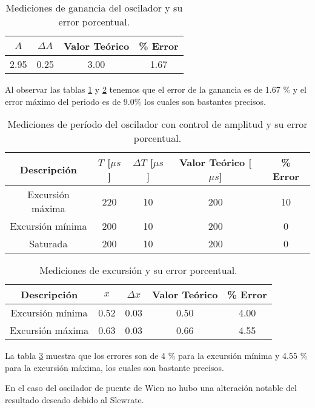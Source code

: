 \begin{table}[ht]
\centering
\begin{tabular}{|c|c|c|c|}
\hline
\(A\) & \(\Delta A\) & Valor Teórico & \% Error \\ \hline
2.95 & 0.25 & 3.00 & 1.67 \\ \hline
\end{tabular}
\caption{Mediciones de ganancia del oscilador y su error porcentual.}
\label{tab:mediciones-ganancia-error}
\end{table}

Al observar las tablas \ref{tab:mediciones-ganancia-error} y \ref{tab:mediciones-periodo-error} tenemos que el error de la ganancia es de 1.67 \% y el error máximo del periodo es de 9.0\% los cuales son bastantes precisos.

\begin{table}[ht]
\centering
\begin{tabular}{|c|c|c|c|c|}
\hline
Descripción & \(T\) [$\mu s$] & \(\Delta T\) [$\mu s$] & Valor Teórico [$\mu s$] & \% Error \\ \hline
Excursión máxima & 220 & 10 & 200 & 10 \\ \hline
Excursión mínima & 200 & 10 & 200 & 0 \\ \hline
Saturada & 200 & 10 & 200 & 0 \\ \hline
\end{tabular}
\caption{Mediciones de período del oscilador con control de amplitud y su error porcentual.}
\label{tab:mediciones-periodo-error}
\end{table}

\begin{table}[ht]
\centering
\begin{tabular}{|c|c|c|c|c|}
\hline
Descripción & \(x\) & \(\Delta x\) & Valor Teórico & \% Error \\ \hline
Excursión mínima & 0.52 & 0.03 & 0.50 & 4.00 \\ \hline
Excursión máxima & 0.63 & 0.03 & 0.66 & 4.55 \\ \hline
\end{tabular}
\caption{Mediciones de excursión y su error porcentual.}
\label{tab:mediciones-excursion-error}
\end{table}

La tabla \ref{tab:mediciones-excursion-error} muestra que los errores son de 4 \% para la excursión mínima y 4.55 \% para la excursión máxima, los cuales son bastante precisos.


En el caso del oscilador de puente de Wien no hubo una alteración notable del resultado deseado debido al Slewrate.
